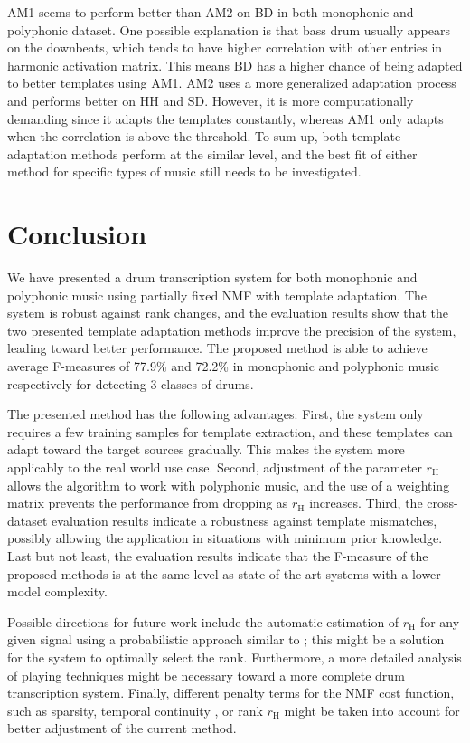\documentclass{article}
\begin{document}
AM1 seems to perform better than AM2 on BD in both monophonic and polyphonic dataset. One possible explanation is that bass drum usually appears on the downbeats, which tends to have higher correlation with other entries in harmonic activation matrix. This means BD has a higher chance of being adapted to better templates using AM1. AM2 uses a more generalized adaptation process and performs better on HH and SD. However, it is more computationally demanding since it adapts the templates constantly, whereas AM1 only adapts when the correlation is above the threshold. To sum up, both template adaptation methods perform at the similar level, and the best fit of either method for specific types of music still needs to be investigated. 

\section{Conclusion}\label{sec:Conclusion}
We have presented a drum transcription system for both monophonic and polyphonic music using partially fixed NMF with template adaptation. The system is robust against rank changes, and %
the evaluation results show that the two presented template adaptation methods improve the precision of the system, leading toward better performance. The proposed method is able to achieve average F-measures of 77.9\% and 72.2\% in monophonic and polyphonic music respectively for detecting 3 classes of drums. 

The presented method has the following advantages: 
First, the system only requires a few training samples for template extraction, and these templates can adapt toward the target sources gradually. This makes the system more applicably to the real world use case. Second, adjustment of the parameter $r_\mathrm{H}$ allows the algorithm to work with polyphonic music, and the use of a weighting matrix prevents the performance from dropping as $r_\mathrm{H}$ increases. Third, the cross-dataset evaluation results indicate a robustness against template mismatches, possibly allowing the application in situations with minimum prior knowledge. Last but not least, the evaluation results indicate that the F-measure of the proposed methods is at the same level as state-of-the art systems with a lower model complexity. 

Possible directions for future work include the
automatic estimation of $r_\mathrm{H}$ for any given signal using a probabilistic approach similar to  \cite{ouo_inmf_2010}; this might be a solution for the system to optimally select the rank. Furthermore, a more detailed analysis of playing techniques might be necessary toward a more complete drum transcription system. Finally, different penalty terms for the NMF cost function, such as sparsity, temporal continuity \cite{virtanen_ssnmf_2007}, or rank $r_\mathrm{H}$ might be taken into account for better adjustment of the current method.   


\end{document}
